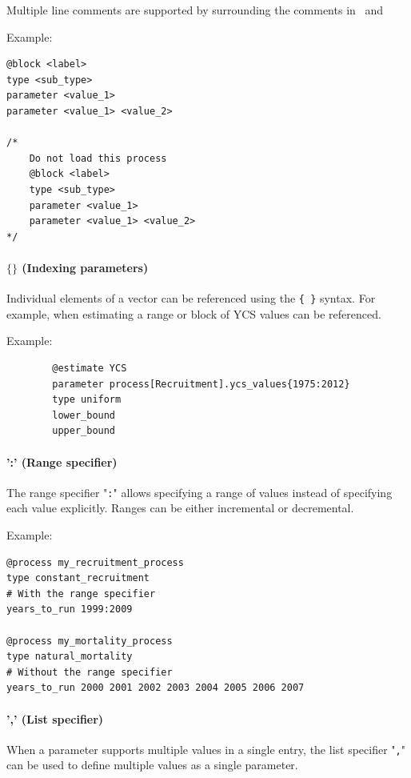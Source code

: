 Multiple line comments are supported by surrounding the comments in \commentstart\ and \commentend

Example:

{\small{\begin{verbatim}
@block <label>
type <sub_type>
parameter <value_1>
parameter <value_1> <value_2>

/*
	Do not load this process
	@block <label>
	type <sub_type>
	parameter <value_1>
	parameter <value_1> <value_2>
*/
\end{verbatim}}}

\paragraph*{$\{ \}$ (Indexing parameters)}

Individual elements of a vector can be referenced using the \texttt{\{ \}} syntax. For example, when estimating  a range or block of YCS values can be referenced.

Example:

{\small{\begin{verbatim}
		@estimate YCS
		parameter process[Recruitment].ycs_values{1975:2012}
		type uniform
		lower_bound
		upper_bound
		\end{verbatim}}}

\paragraph*{':' (Range specifier)}

The range specifier "\texttt{:}" allows specifying a range of values instead of specifying each value explicitly. Ranges can be either incremental or decremental.

Example:

{\small{\begin{verbatim}
@process my_recruitment_process
type constant_recruitment
# With the range specifier
years_to_run 1999:2009

@process my_mortality_process
type natural_mortality
# Without the range specifier
years_to_run 2000 2001 2002 2003 2004 2005 2006 2007
\end{verbatim}}}

\paragraph*{',' (List specifier)}

When a parameter supports multiple values in a single entry, the list specifier "\texttt{,}" can be used to define multiple values as a single parameter.


